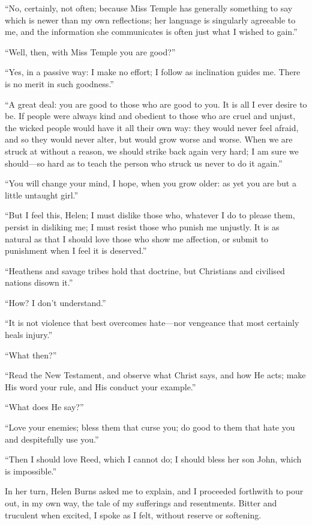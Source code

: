 \enquote{No, certainly, not often; because Miss Temple has generally
	something to say which is newer than my own reflections; her language is
	singularly agreeable to me, and the information she communicates is
	often just what I wished to gain.}

\enquote{Well, then, with Miss Temple you are good?}

\enquote{Yes, in a passive way: I make no effort; I follow as
	inclination guides me.  There is no merit in such goodness.}

\enquote{A great deal: you are good to those who are good to you.  It is
	all I ever desire to be.  If people were always kind and obedient to
	those who are cruel and unjust, the wicked people would have it all
	their own way: they would never feel afraid, and so they would never
	alter, but would grow worse and worse.  When we are struck at without a
	reason, we should strike back again very hard; I am sure we should---so
	hard as to teach the person who struck us never to do it again.}

\enquote{You will change your mind, I hope, when you grow older: as yet
	you are but a little untaught girl.}

\enquote{But I feel this, Helen; I must dislike those who, whatever I do
	to please them, persist in disliking me; I must resist those who punish
	me unjustly.  It is as natural as that I should love those who show me
	affection, or submit to punishment when I feel it is deserved.}

\enquote{Heathens and savage tribes hold that doctrine, but Christians
	and civilised nations disown it.}

\enquote{How?  I don't understand.}

\enquote{It is not violence that best overcomes hate---nor vengeance
	that most certainly heals injury.}

\enquote{What then?}

\enquote{Read the New Testament, and observe what Christ says, and how
	He acts; make His word your rule, and His conduct your example.}

\enquote{What does He say?}

\enquote{Love your enemies; bless them that curse you; do good to them
	that hate you and despitefully use you.}

\enquote{Then I should love \Mrs{} Reed, which I cannot do; I should bless
	her son John, which is impossible.}

In her turn, Helen Burns asked me to explain, and I proceeded forthwith
to pour out, in my own way, the tale of my sufferings and resentments.
Bitter and truculent when excited, I spoke as I felt, without reserve or
softening.

